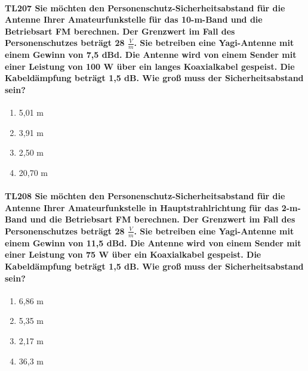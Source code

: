 \documentclass[8pt]{article}
\begin{document}
\paragraph*{TL207 Sie möchten den Personenschutz-Sicherheitsabstand für die Antenne Ihrer Amateurfunkstelle für das 10-m-Band und die Betriebsart FM berechnen. Der Grenzwert im Fall des Personenschutzes beträgt 28 $\frac{V}{m}$. Sie betreiben eine Yagi-Antenne mit einem Gewinn von 7,5 dBd. Die Antenne wird von einem Sender mit einer Leistung von 100 W über ein langes Koaxialkabel gespeist. Die Kabeldämpfung beträgt 1,5 dB. Wie groß muss der Sicherheitsabstand sein?}
\begin{enumerate}[nolistsep,label=\Alph*]
\item 5,01 m
\item 3,91 m
\item 2,50 m
\item 20,70 m
\end{enumerate}

\paragraph*{TL208 Sie möchten den Personenschutz-Sicherheitsabstand für die Antenne Ihrer Amateurfunkstelle in Hauptstrahlrichtung für das 2-m-Band und die Betriebsart FM berechnen. Der Grenzwert im Fall des Personenschutzes beträgt 28 $\frac{V}{m}$. Sie betreiben eine Yagi-Antenne mit einem Gewinn von 11,5 dBd. Die Antenne wird von einem Sender mit einer Leistung von 75 W über ein Koaxialkabel gespeist. Die Kabeldämpfung beträgt 1,5 dB. Wie groß muss der Sicherheitsabstand sein?}
\begin{enumerate}[nolistsep,label=\Alph*]
\item 6,86 m
\item 5,35 m
\item 2,17 m
\item 36,3 m
\end{enumerate}
\end{document}
